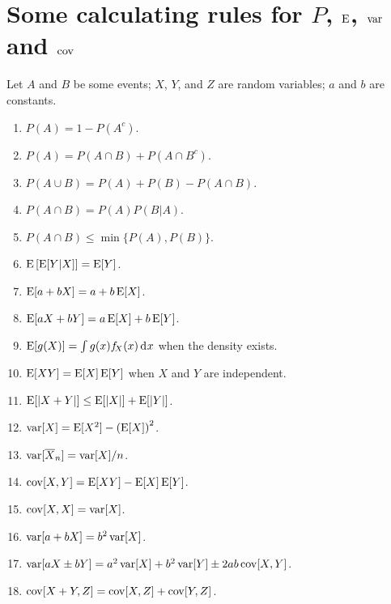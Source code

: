 \documentclass[10pt]{article}
\begin{document}
\section{Some calculating rules for $P$, $\operatorname{E}$, $\operatorname{var}$ and $\operatorname{cov}$}
Let $A$ and $B$ be some events; $X$, $Y$, and $Z$ are random variables; $a$ and $b$
are constants.
\begin{enumerate}
\item $P(A) = 1 - P(A^c)$.
\item $P(A) = P(A\cap B) + P(A\cap B^c)$.
\item $P(A\cup B) = P(A) + P(B) - P(A\cap B)$.
\item $P(A \cap B) = P(A)P(B|A)$.
\item $P(A\cap B) \leq \min\{P(A), P(B)\}$.
\item $\operatorname{E}\left[\operatorname{E}[Y|X]\right] = \operatorname{E}[Y]$.
\item $\operatorname{E}[a + bX ] = a + b\operatorname{E}[X]$.
\item $\operatorname{E}[a X + b Y] = a\operatorname{E}[X] + b\operatorname{E}[Y]$.
\item $\E[g(X)] = \int g(x) f_{\!X}(x) \rd x$ when the density exists.
\item $\operatorname{E}[XY] = \operatorname{E}[X]\operatorname{E}[Y]$ when $X$ and $Y$ are independent.
\item $\operatorname{E}[|X+Y|] \leq \operatorname{E}[|X|] + \operatorname{E}[|Y|]$.
\item $\operatorname{var}[X] = \operatorname{E}[X^2] - \left(\operatorname{E}[X]\right)^2$.
\item $\operatorname{var}[\overline{X}_n] = \operatorname{var}[X] / n$. 
\item $\operatorname{cov}[X,Y] = \operatorname{E}[XY] - \operatorname{E}[X]\operatorname{E}[Y]$.
\item $\operatorname{cov}[X,X] = \operatorname{var}[X]$.
\item $\operatorname{var}[a + bX] = b^2 \operatorname{var}[X]$.
\item $\operatorname{var}[a X \pm b Y] = a^2 \operatorname{var}[X] + b^2 \operatorname{var}[Y] \pm 2 a b \operatorname{cov}[X,Y]$.
\item $\operatorname{cov}[X+Y,Z] =  \operatorname{cov}[X,Z] + \operatorname{cov}[Y,Z]$.
\end{enumerate}




\clearpage
\end{document}
